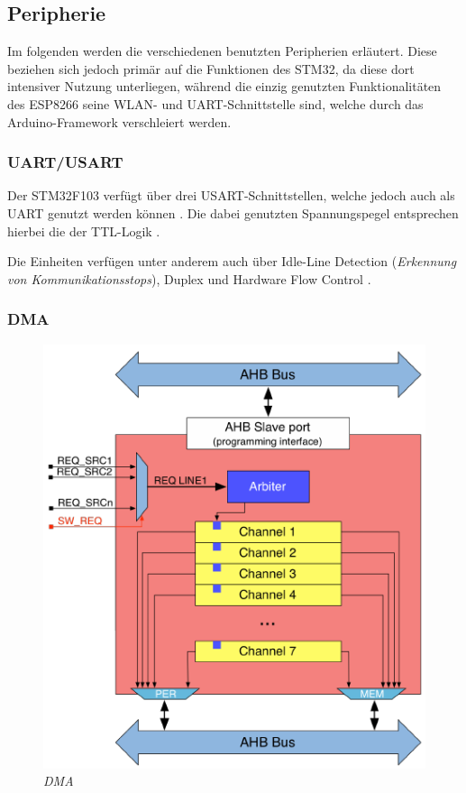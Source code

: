 \subsection{Peripherie}

Im folgenden werden die verschiedenen benutzten Peripherien erläutert. Diese beziehen sich jedoch primär auf die Funktionen des STM32, da diese
dort intensiver Nutzung unterliegen, während die einzig genutzten Funktionalitäten des ESP8266 seine WLAN- und UART-Schnittstelle sind,
welche durch das Arduino-Framework verschleiert werden.

\subsubsection{UART/USART}

Der STM32F103 verfügt über drei \ac{USART}-Schnittstellen, welche jedoch auch als \ac{UART} genutzt werden können \citep{STM32_Datasheet}.
Die dabei genutzten Spannungspegel entsprechen hierbei die der TTL-Logik \citep{STM32_Datasheet}.

\smallskip

Die Einheiten verfügen unter anderem auch über Idle-Line Detection (\textit{Erkennung von Kommunikationsstops}), Duplex und Hardware Flow 
Control \citep{STM32_Ref}.




\subsubsection{DMA}

\begin{figure}
     \vspace{-\baselineskip}
         \centering
         \includegraphics[scale=0.3]{Pictures/dma_channel.png}
         \caption{\textit{DMA \citep{MasteringSTM}}}
         \label{img:DMA_Controller}
 \end{figure}

